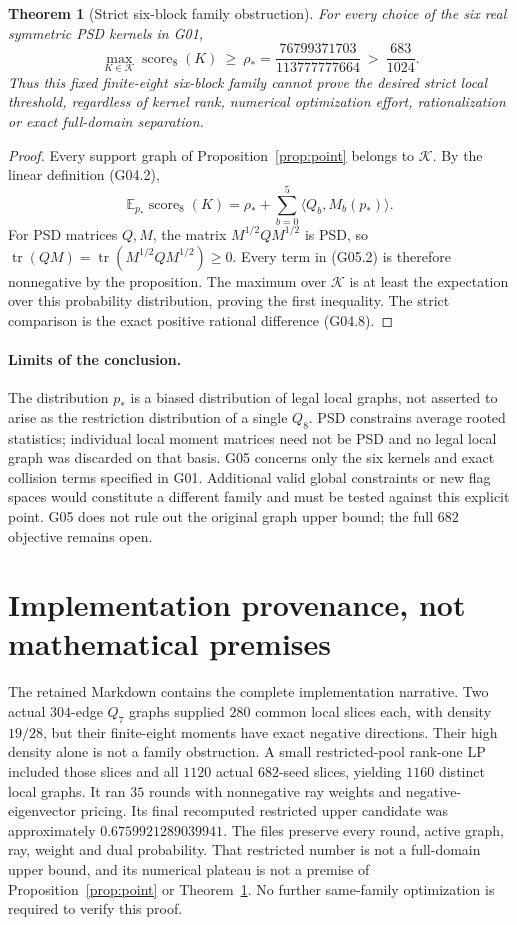 \documentclass[11pt]{article}
\newtheorem{theorem}{Theorem}
\newcommand{\scor}{\operatorname{score}_8}
\newcommand{\E}{\mathbb E}
\newcommand{\tr}{\operatorname{tr}}
\newcommand{\file}[1]{\texttt{\detokenize{#1}}}
\begin{document}
\begin{theorem}[Strict six-block family obstruction]\label{thm:obstruction}
For every choice of the six real symmetric PSD kernels in G01,
\[
 \max_{K\in\mathcal K}\scor(K)
 \ \ge\ \rho_*
 =\frac{76799371703}{113777777664}
 \ >\ \frac{683}{1024}.
 \tag{G05.1}
\]
Thus this fixed finite-eight six-block family cannot prove the desired
strict local threshold, regardless of kernel rank, numerical
optimization effort, rationalization or exact full-domain separation.
\end{theorem}
\begin{proof}
Every support graph of Proposition~\ref{prop:point} belongs to
\(\mathcal K\).  By the linear definition (G04.2),
\[
 \E_{p_*}\scor(K)
 =\rho_*+\sum_{b=0}^5\langle Q_b,M_b(p_*)\rangle.
 \tag{G05.2}
\]
For PSD matrices \(Q,M\), the matrix \(M^{1/2}QM^{1/2}\) is PSD, so
\(\tr(QM)=\tr(M^{1/2}QM^{1/2})\ge0\).
Every term in (G05.2) is therefore nonnegative by the proposition.
The maximum over \(\mathcal K\) is at least the expectation over this
probability distribution, proving the first inequality.
The strict comparison is the exact positive rational difference
(G04.8).
\end{proof}

\paragraph{Limits of the conclusion.}
The distribution \(p_*\) is a biased distribution of legal local graphs,
not asserted to arise as the restriction distribution of a single
\(Q_8\).  PSD constrains average rooted statistics; individual local
moment matrices need not be PSD and no legal local graph was discarded
on that basis.  G05 concerns only the six kernels and exact collision
terms specified in G01.  Additional valid global constraints or new
flag spaces would constitute a different family and must be tested
against this explicit point.  G05 does not rule out the original graph
upper bound; the full \(682\) objective remains open.

\section*{Implementation provenance, not mathematical premises}

The retained Markdown contains the complete implementation narrative.
Two actual \(304\)-edge \(Q_7\) graphs supplied \(280\) common local
slices each, with density \(19/28\), but their finite-eight moments have
exact negative directions.  Their high density alone is not a family
obstruction.
A small restricted-pool rank-one LP included those slices and all
\(1120\) actual \(682\)-seed slices, yielding \(1160\) distinct local
graphs.  It ran \(35\) rounds with nonnegative ray weights and
negative-eigenvector pricing.  Its final recomputed restricted upper
candidate was approximately \(0.6759921289039941\).
The \file{working_*} files preserve every round, active graph, ray,
weight and dual probability.  That restricted number is not a
full-domain upper bound, and its numerical plateau is not a premise
of Proposition~\ref{prop:point} or Theorem~\ref{thm:obstruction}.
No further same-family optimization is required to verify this proof.
\end{document}
